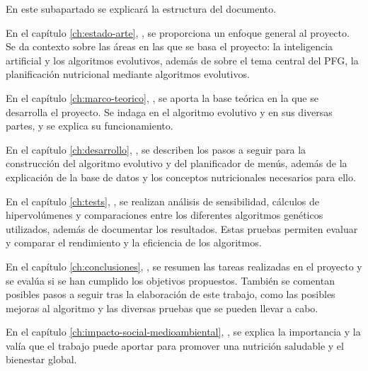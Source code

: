 En este subapartado se explicará la estructura del documento.

En el capítulo \ref{ch:estado-arte}, , se proporciona un enfoque general al proyecto. Se da contexto sobre las áreas en las que se basa el proyecto: la inteligencia artificial y los algoritmos evolutivos, además de sobre el tema central del PFG, la planificación nutricional mediante algoritmos evolutivos.

En el capítulo \ref{ch:marco-teorico}, , se aporta la base teórica en la que se desarrolla el proyecto. Se indaga en el algoritmo evolutivo y en sus diversas partes, y se explica su funcionamiento.

En el capítulo \ref{ch:desarrollo}, , se describen los pasos a seguir para la construcción del algoritmo evolutivo y del planificador de menús, además de la explicación de la base de datos y los conceptos nutricionales necesarios para ello.

En el capítulo \ref{ch:tests}, , se realizan análisis de sensibilidad, cálculos de hipervolúmenes y comparaciones entre los diferentes algoritmos genéticos utilizados, además de documentar los resultados. Estas pruebas permiten evaluar y comparar el rendimiento y la eficiencia de los algoritmos.

En el capítulo \ref{ch:conclusiones}, , se resumen las tareas realizadas en el proyecto y se evalúa si se han cumplido los objetivos propuestos. También se comentan posibles pasos a seguir tras la elaboración de este trabajo, como las posibles mejoras al algoritmo y las diversas pruebas que se pueden llevar a cabo.

En el capítulo \ref{ch:impacto-social-medioambiental}, , se explica la importancia y la valía que el trabajo puede aportar para promover una nutrición saludable y el bienestar global. 
